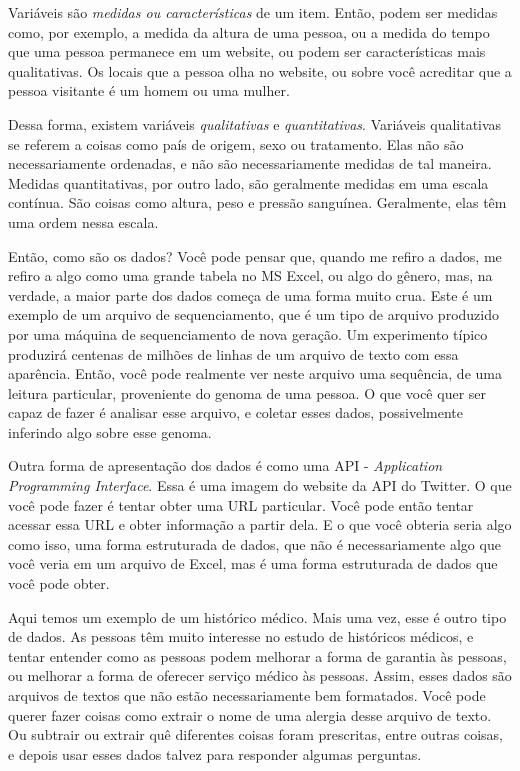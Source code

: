 Variáveis são \emph{medidas ou características} de um item. Então, podem ser medidas como, por exemplo, a medida da altura de uma pessoa, ou a medida do tempo que uma pessoa permanece em um website, ou podem ser características mais qualitativas. Os locais que a pessoa olha no website, ou sobre você acreditar que a pessoa visitante é um homem ou uma mulher.

Dessa forma, existem variáveis \emph{qualitativas} e \emph{quantitativas}. Variáveis qualitativas se referem a coisas como país de origem, sexo ou tratamento. Elas não são necessariamente ordenadas, e não são necessariamente medidas de tal maneira. Medidas quantitativas, por outro lado, são geralmente medidas em uma escala contínua. São coisas como altura, peso e pressão sanguínea. Geralmente, elas têm uma ordem nessa escala.

Então, como são os dados? Você pode pensar que, quando me refiro a dados, me refiro a algo como uma grande tabela no MS Excel, ou algo do gênero, mas, na verdade, a maior parte dos dados começa de uma forma muito crua. Este é um exemplo de um arquivo de sequenciamento, que é um tipo de arquivo produzido por uma máquina de sequenciamento de nova geração. Um experimento típico produzirá centenas de milhões de linhas de um arquivo de texto com essa aparência. Então, você pode realmente ver neste arquivo uma sequência, de uma leitura particular, proveniente do genoma de uma pessoa. O que você quer ser capaz de fazer é analisar esse arquivo, e coletar esses dados, possivelmente inferindo algo sobre esse genoma. 

Outra forma de apresentação dos dados é como uma API - \textit{Application Programming Interface}. Essa é uma imagem do website da API do Twitter. O que você pode fazer é tentar obter uma URL particular. Você pode então tentar acessar essa URL e obter informação a partir dela. E o que você obteria seria algo como isso, uma forma estruturada de dados,  que não é necessariamente algo que você veria em um arquivo de Excel, mas é uma forma estruturada de dados que você pode obter. 

Aqui temos um exemplo de um histórico médico. Mais uma vez, esse é outro tipo de dados. As pessoas têm muito interesse no estudo de históricos médicos, e tentar entender como as pessoas podem melhorar a forma de garantia às pessoas, ou melhorar a forma de oferecer serviço médico às pessoas. Assim, esses dados são arquivos de textos que não estão necessariamente bem formatados. Você pode querer fazer coisas como extrair o nome de uma alergia desse arquivo de texto. Ou subtrair ou extrair quê diferentes coisas foram prescritas, entre outras coisas, e depois usar esses dados talvez para responder algumas perguntas.

